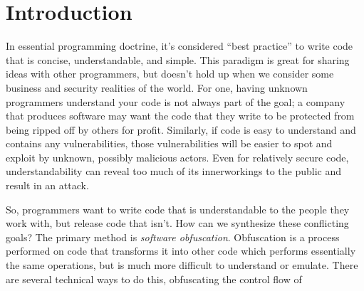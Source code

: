 \section{Introduction}
In essential programming doctrine, it's considered ``best practice'' to write code that
is concise, understandable, and simple. This paradigm is great for sharing ideas
with other programmers, but doesn't hold up when we consider some business and 
security realities of the world. For one, having unknown programmers understand
your code is not always part of the goal; a company that produces software may
want the code that they write to be protected from being ripped off by others
for profit. Similarly, if code is easy to understand and contains any vulnerabilities, 
those vulnerabilities will be easier to spot and exploit by unknown, possibly
malicious actors. Even for relatively secure code, understandability can reveal
too much of its innerworkings to the public and result in an attack.
\par So, programmers want to write code that is understandable to the people 
they work with, but release code that isn't. How can we synthesize 
these conflicting goals? The primary method is {\itshape software obfuscation}.
Obfuscation is a process performed on code that transforms it into other code
which performs essentially the same operations, but is much more difficult to 
understand or emulate. There are several technical ways to do this, obfuscating
the control flow of 
